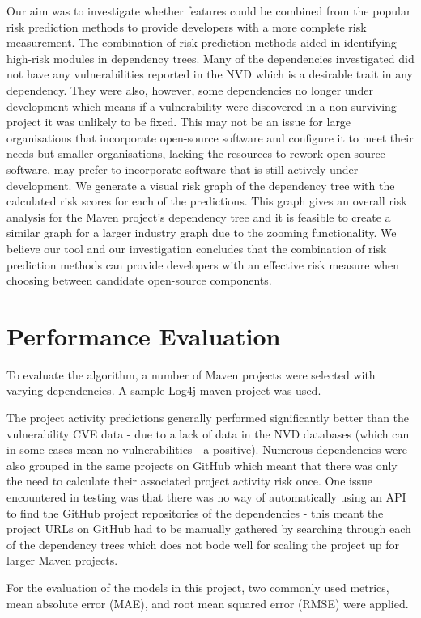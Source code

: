 \documentclass[conference]{IEEEtran}
\begin{document}
Our aim was to investigate whether features could be combined from the popular risk prediction methods to provide developers with a more complete risk measurement. The combination of risk prediction methods aided in identifying high-risk modules in dependency trees. Many of the dependencies investigated did not have any vulnerabilities reported in the NVD which is a desirable trait in any dependency. They were also, however, some dependencies no longer under development which means if a vulnerability were discovered in a non-surviving project it was unlikely to be fixed. This may not be an issue for large organisations that incorporate open-source software and configure it to meet their needs but smaller organisations, lacking the resources to rework open-source software, may prefer to incorporate software that is still actively under development. We generate a visual risk graph of the dependency tree with the calculated risk scores for each of the predictions. This graph gives an overall risk analysis for the Maven project's dependency tree and it is feasible to create a similar graph for a larger industry graph due to the zooming functionality. We believe our tool and our investigation concludes that the combination of risk prediction methods can provide developers with an effective risk measure when choosing between candidate open-source components. 

\section{Performance Evaluation}
To evaluate the algorithm, a number of Maven projects were selected with varying dependencies. A sample Log4j maven project was used. 

The project activity predictions generally performed significantly better than the vulnerability CVE data - due to a lack of data in the NVD databases (which can in some cases mean no vulnerabilities - a positive). Numerous dependencies were also grouped in the same projects on GitHub which meant that there was only the need to calculate their associated project activity risk once. One issue encountered in testing was that there was no way of automatically using an API to find the GitHub project repositories of the dependencies - this meant the project URLs on GitHub had to be manually gathered by searching through each of the dependency trees which does not bode well for scaling the project up for larger Maven projects. 

For the evaluation of the models in this project, two commonly used metrics, mean absolute error (MAE), and root mean squared error (RMSE) were applied. 
\end{document}
